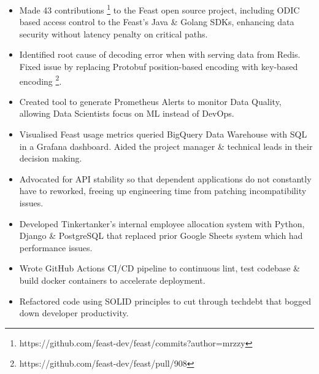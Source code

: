 \begin{itemize}
  \item Made 43 contributions \footnote{https://github.com/feast-dev/feast/commits?author=mrzzy} 
    to the Feast open source project, including ODIC based access control to the Feast's Java 
    \& Golang SDKs, enhancing data security without latency penalty on critical paths.

  \item Identified root cause of decoding error when with serving data from Redis.
    Fixed issue by replacing Protobuf position-based encoding with key-based encoding
    \footnote{https://github.com/feast-dev/feast/pull/908}.

  \item Created tool to generate Prometheus Alerts to monitor Data Quality,
    allowing Data Scientists focus on ML instead of DevOps.

  \item Visualised Feast usage metrics queried BigQuery Data Warehouse with SQL 
    in a Grafana dashboard. Aided the project manager \& technical leads in their decision making.

  \item Advocated for API stability so that dependent applications do not constantly
    have to reworked, freeing up engineering time from patching incompatibility issues.
\end{itemize}

\begin{itemize}
  \item Developed Tinkertanker's internal employee allocation system with 
    Python, Django \& PostgreSQL that replaced prior Google Sheets system 
    which had performance issues.
  \item Wrote GitHub Actions CI/CD pipeline to continuous lint, test codebase
    \& build docker containers to accelerate deployment.
  \item Refactored code using SOLID principles to cut through techdebt that
    bogged down developer productivity.
\end{itemize}

